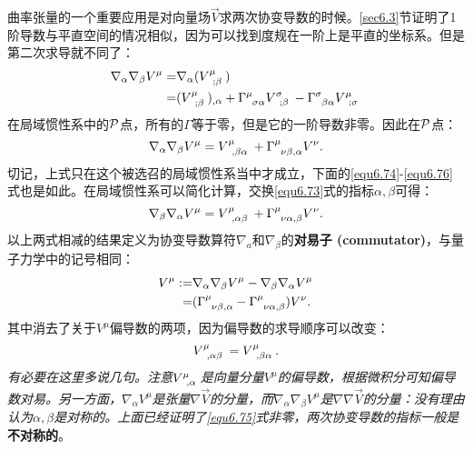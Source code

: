 曲率张量的一个重要应用是对向量场$\vec{V}$求两次协变导数的时候。\ref{sec6.3}节证明了1阶导数与平直空间的情况相似，因为可以找到度规在一阶上是平直的坐标系。但是第二次求导就不同了：
\begin{align}
    \nabla_\alpha \nabla_\beta V^\mu =& \nabla_\alpha (V\indices{^\mu_{; \beta}}) \notag \\
    =& (V\indices{^\mu_{; \beta}})_{, \alpha} + \Gamma\indices{^\mu_{\sigma \alpha}} V\indices{^\sigma_{; \beta}} - \Gamma\indices{^\sigma_{\beta \alpha}} V\indices{^\mu_{; \sigma}}
\label{equ6.72}
\end{align}
在局域惯性系中的$\mathcal{P}$点，所有的$\Gamma$等于零，但是它的一阶导数非零。因此在$\mathcal{P}$点：
\begin{equation}
    \nabla_\alpha \nabla_\beta V^\mu = V\indices{^\mu_{, \beta \alpha}} + \Gamma\indices{^\mu_{\nu \beta, \alpha}} V^\nu.
\label{equ6.73}
\end{equation}
切记，上式只在这个被选召的局域惯性系当中才成立，下面的\eqref{equ6.74}-\eqref{equ6.76}式也是如此。在局域惯性系可以简化计算，交换\eqref{equ6.73}式的指标$\alpha, \beta$可得：
\begin{equation}
    \nabla_\beta \nabla_\alpha V^\mu = V\indices{^\mu_{, \alpha \beta}} + \Gamma\indices{^\mu_{\nu \alpha, \beta}} V^\nu.
\label{equ6.74}
\end{equation}
以上两式相减的结果定义为协变导数算符$\nabla_a$和$\nabla_\beta$的\textbf{对易子 (commutator)}，与量子力学中的记号相同：
\begin{align}
    [\nabla_\alpha, \nabla_\beta] V^\mu :=& \nabla_\alpha \nabla_\beta V^\mu - \nabla_\beta \nabla_\alpha V^\mu \notag \\
    = & (\Gamma\indices{^\mu_{\nu \beta, \alpha}} - \Gamma\indices{^\mu_{\nu \alpha, \beta}}) V^\nu.
\label{equ6.75}
\end{align}
其中消去了关于$V^\mu$偏导数的两项，因为偏导数的求导顺序可以改变：
\begin{equation}
    V\indices{^\mu_{, \alpha \beta}} = V\indices{^\mu_{, \beta \alpha}}.
\label{equ6.76}
\end{equation}
\textit{有必要在这里多说几句。注意$V\indices{^\mu_{, \alpha}}$是向量分量$V^\mu$的偏导数，根据微积分可知偏导数对易。另一方面，$\nabla_\alpha V^\mu$是张量$\nabla \vec{V}$的分量，而$\nabla_\alpha \nabla_\beta V^\mu$是$\nabla \nabla \vec{V}$的分量：没有理由认为$\alpha, \beta$是对称的。上面已经证明了\eqref{equ6.75}式非零，两次协变导数的指标一般是}\textbf{不对称的}。

